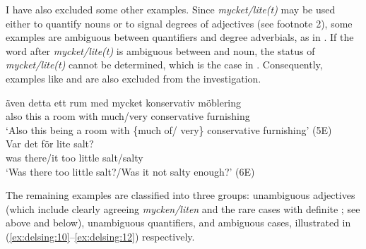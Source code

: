 \documentclass[output=paper]{langscibook}
\begin{document}
I have also excluded some other examples. Since \textit{mycket/lite(t)} may be used either to quantify nouns or to signal degrees of adjectives (see footnote 2), some examples are ambiguous between quantifiers and degree adverbials, as in . If the word after \textit{mycket/lite(t)} is ambiguous between  and noun, the status of \textit{mycket/lite(t)} cannot be determined, which is the case in . Consequently, examples like  and  are also excluded from the investigation.


\ea\label{ex:delsing:8}
\gll även    detta  ett  rum    med    mycket    konservativ    möblering \\
also      this      a    room  with  much/very  conservative    furnishing\\
\glt `Also this being a room with \{much of/ very\} conservative furnishing’ (5E)\\
\ex\label{ex:delsing:9}
\gll Var    det         för   lite     salt?\\
was     there/it       too     little   salt/salty\\
\glt ‘Was there too little salt?\slash Was it not salty enough?’ (6E)
\z



The remaining examples are classified into three groups: unambiguous adjectives (which include clearly agreeing \textit{mycken/liten} and the rare cases with definite ; see  above and  below), unambiguous quantifiers, and ambiguous cases, illustrated in (\ref{ex:delsing:10}--\ref{ex:delsing:12}) respectively.
\end{document}
